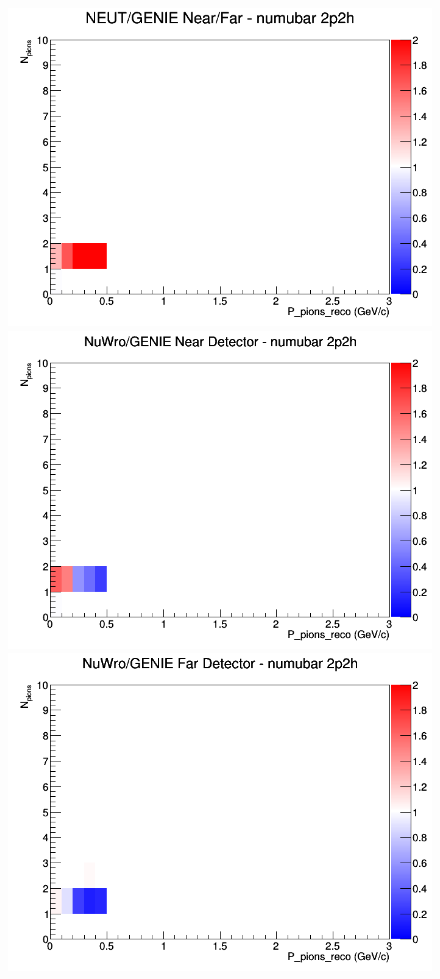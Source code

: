 \documentclass[12pt]{article}
\begin{document}
\begin{figure}[h]
\endminipage
{}
\includegraphics[width=\linewidth]{eff_N_P/GAr/pions/ratios/2p2h_NEUT_GENIE_numubar_NF_N_P.png}
\endminipage
\newline
{}
\includegraphics[width=\linewidth]{eff_N_P/GAr/pions/ratios/2p2h_NuWro_GENIE_numubar_near_N_P.png}
\endminipage
{}
\includegraphics[width=\linewidth]{eff_N_P/GAr/pions/ratios/2p2h_NuWro_GENIE_numubar_far_N_P.png}

\end{figure}
\end{document}

